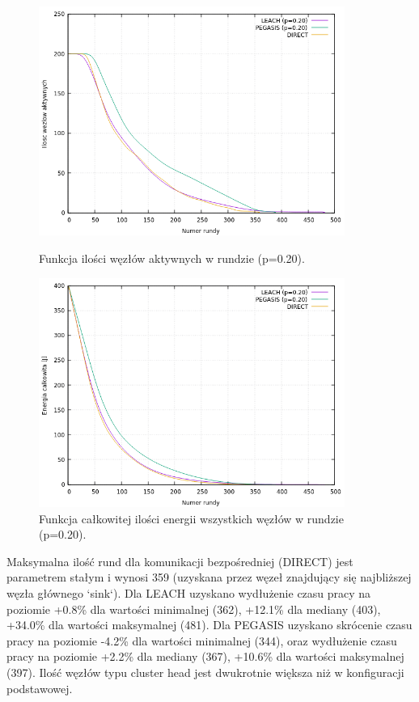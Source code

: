 \documentclass[a4paper,12pt,twoside,openany]{report}
\begin{document}
\begin{figure}[H]
 \centering
 \includegraphics[width=10cm]{images/gnuplot/test_4/nodes_in_round_p020.png}
 \caption{Funkcja ilości węzłów aktywnych w rundzie (p=0.20).}
 \includegraphics[width=10cm]{images/gnuplot/test_4/energy_in_round_p020.png}
 \caption{Funkcja całkowitej ilości energii wszystkich węzłów w rundzie (p=0.20).}
\end{figure}

\par
Maksymalna ilość rund dla komunikacji bezpośredniej (DIRECT) jest parametrem stałym i wynosi 359 (uzyskana przez węzeł znajdujący się najbliższej węzła głównego `sink`).
Dla LEACH uzyskano wydłużenie czasu pracy na poziomie +0.8\% dla wartości minimalnej (362), +12.1\% dla mediany (403), +34.0\% dla wartości maksymalnej (481).
Dla PEGASIS uzyskano skrócenie czasu pracy na poziomie -4.2\% dla wartości minimalnej (344), oraz wydłużenie czasu pracy na poziomie +2.2\% dla mediany (367), +10.6\% dla wartości maksymalnej (397).
Ilość węzłów typu cluster head jest dwukrotnie większa niż w konfiguracji podstawowej.
\end{document}
